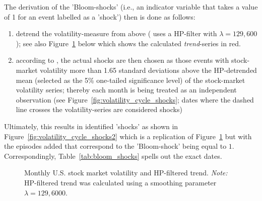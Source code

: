 \documentclass[a4paper,12pt,oneside,pointednumbers,numbers=noenddot,bibtotoc,bigheadings,liststotoc,chapterprefix=true]{scrbook}
\begin{document}
The derivation of the 'Bloom-shocks' (i.e., an indicator variable that takes a value of 1 for an event labelled as a 'shock') then is done as follows:
\begin{enumerate}[i]
	\item detrend the volatility-measure from above (\citet{bloom:09} uses a HP-filter with $\lambda = 129,600$); see also Figure~\ref{fig:volatility_trend} below which shows the calculated \textit{trend}-series in red. 
	\item according to \citet{bloom:09}, the actual shocks are then chosen as those events with stock-market volatility more than 1.65 standard deviations above the HP-detrended mean (selected as the 5\% one-tailed significance level) of the stock-market volatility series; thereby each month is being treated as an independent observation (see Figure~\ref{fig:volatility_cycle_shocks}; dates where the dashed line crosses the volatility-series are considered shocks)
\end{enumerate}

Ultimately, this results in identified 'shocks' as shown in Figure~\ref{fig:volatility_cycle_shocks2} which is a replication of Figure~\ref{fig:volatility_trend} but with the episodes added that correspond to the 'Bloom-shock' being equal to $1$. Correspondingly, Table~\ref{tab:bloom_shocks} spells out the exact dates.
\begin{figure}[hbt]
   \centering
   \setlength\fboxsep{0pt}
   \setlength\fboxrule{0pt}
      \caption[Monthly U.S. stock market volatility and HP-filtered trend.]{Monthly U.S. stock market volatility and HP-filtered trend.
      \textit{Note:} HP-filtered trend was calculated using a smoothing parameter $\lambda = 129,6000$.}   \label{fig:volatility_trend}
\end{figure}
\end{document}
